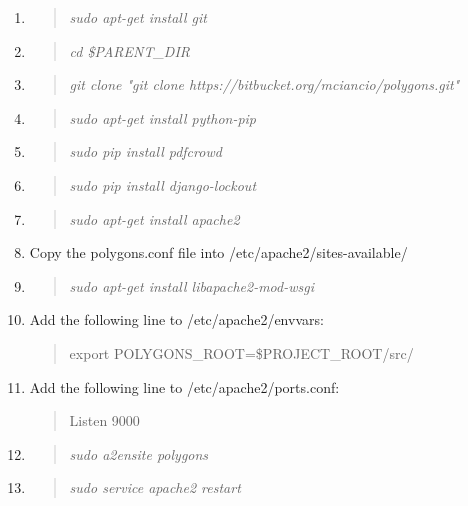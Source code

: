 \documentclass[12pt]{article}
\newenvironment{command}
   { 
      \begin{quote}\itshape
      \color{blue}
   }
   { \end{quote} }
\newenvironment{data}
   { 
      \begin{quote}\itshape
      \color{red}
   }
   { \end{quote} }
\begin{document}
\begin{enumerate}
   \item \begin{command} sudo apt-get install git \end{command}
   \item \begin{command} cd \$PARENT\_DIR \end{command}
   \item \begin{command} git clone "git clone
         https://bitbucket.org/mciancio/polygons.git" \end{command}
   \item \begin{command} sudo apt-get install python-pip \end{command}
   \item \begin{command} sudo pip install pdfcrowd \end{command}
   \item \begin{command} sudo pip install django-lockout \end{command}
   \item \begin{command} sudo apt-get install apache2 \end{command}
   \item Copy the polygons.conf file into /etc/apache2/sites-available/
   \item \begin{command} sudo apt-get install libapache2-mod-wsgi \end{command}
   \item Add the following line to /etc/apache2/envvars:
         \begin{data}
         export POLYGONS\_ROOT=\$PROJECT\_ROOT/src/
         \end{data}
   \item Add the following line to /etc/apache2/ports.conf:
         \begin{data}
         Listen 9000
         \end{data}
   \item \begin{command} sudo a2ensite polygons \end{command}
   \item \begin{command} sudo service apache2 restart \end{command}

\end{enumerate}
\end{document}
